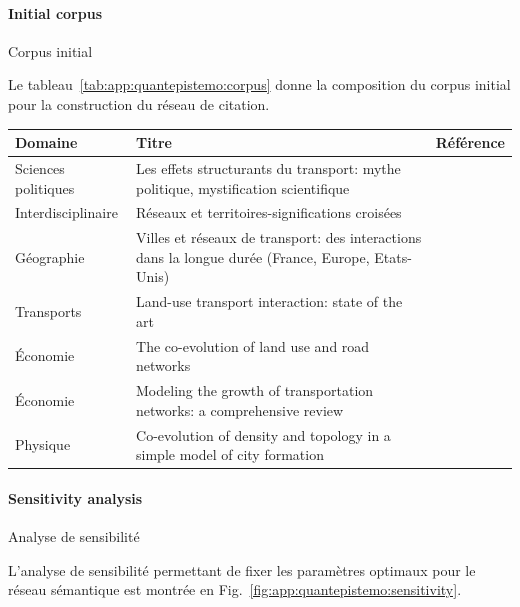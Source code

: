 \paragraph{Initial corpus}{Corpus initial}

Le tableau~\ref{tab:app:quantepistemo:corpus} donne la composition du corpus initial pour la construction du réseau de citation.

\begin{table}
	\begin{tabular}{|l|p{6cm}|l|}
	\hline
	Domaine & Titre & Référence \\\hline
	Sciences politiques & Les effets structurants du transport: mythe politique, mystification scientifique & \cite{offner1993effets} \\\hline 
	Interdisciplinaire & Réseaux et territoires-significations croisées & \cite{offner1996reseaux} \\\hline
	Géographie & Villes et réseaux de transport: des interactions dans la longue durée (France, Europe, Etats-Unis) & \cite{bretagnolle:tel-00459720} \\\hline
	Transports & Land-use transport interaction: state of the art & \cite{wegener2004land} \\\hline
	Économie & The co-evolution of land use and road networks & \cite{levinson2007co} \\\hline
	Économie & Modeling the growth of transportation networks: a comprehensive review & \cite{xie2009modeling} \\\hline
	Physique & Co-evolution of density and topology in a simple model of city formation & \cite{barthelemy2009co} \\\hline
	\end{tabular}
\end{table}




\paragraph{Sensitivity analysis}{Analyse de sensibilité}

L'analyse de sensibilité permettant de fixer les paramètres optimaux pour le réseau sémantique est montrée en Fig.~\ref{fig:app:quantepistemo:sensitivity}.

